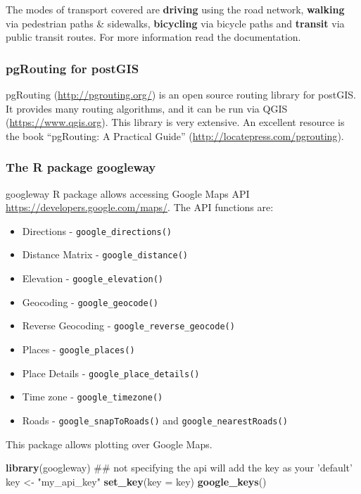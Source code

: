 \documentclass[12pt,graybox,envcountchap,sectrefs]{krantz}
\makeatletter
\newenvironment{Shaded}{\begin{snugshade}}{\end{snugshade}}
\newcommand{\KeywordTok}[1]{\textcolor[rgb]{0.13,0.29,0.53}{\textbf{#1}}}
\newcommand{\DataTypeTok}[1]{\textcolor[rgb]{0.13,0.29,0.53}{#1}}
\newcommand{\StringTok}[1]{\textcolor[rgb]{0.31,0.60,0.02}{#1}}
\newcommand{\NormalTok}[1]{#1}
\providecommand{\tightlist}{%
  \setlength{\itemsep}{0pt}\setlength{\parskip}{0pt}}
\newenvironment{kframe}{%
\medskip{}
\setlength{\fboxsep}{.8em}
 \def\at@end@of@kframe{}%
 \ifinner\ifhmode%
  \def\at@end@of@kframe{\end{minipage}}%
  \begin{minipage}{\columnwidth}%
 \fi\fi%
 \def\FrameCommand##1{\hskip\@totalleftmargin \hskip-\fboxsep
 \colorbox{shadecolor}{##1}\hskip-\fboxsep
     \hskip-\linewidth \hskip-\@totalleftmargin \hskip\columnwidth}%
 \MakeFramed {\advance\hsize-\width
   \@totalleftmargin\z@ \linewidth\hsize
   \@setminipage}}%
 {\par\unskip\endMakeFramed%
 \at@end@of@kframe}
\renewenvironment{Shaded}{\begin{kframe}}{\end{kframe}}
\theoremstyle{definition}
\theoremstyle{definition}
\theoremstyle{definition}
\theoremstyle{remark}
\makeatother
\begin{document}
The modes of transport covered are \textbf{driving} using the road
network, \textbf{walking} via pedestrian paths \& sidewalks,
\textbf{bicycling} via bicycle paths and \textbf{transit} via public
transit routes. For more information read the documentation.

\subsubsection{pgRouting for postGIS}\label{pgrouting-for-postgis}

pgRouting (\url{http://pgrouting.org/}) is an open source routing
library for postGIS. It provides many routing algorithms, and it can be
run via QGIS (\url{https://www.qgis.org}). This library is very
extensive. An excellent resource is the book ``pgRouting: A Practical
Guide'' (\url{http://locatepress.com/pgrouting}).

\subsubsection{The R package googleway}\label{the-r-package-googleway}

googleway \citep{googleway} R package allows accessing Google Maps API
\url{https://developers.google.com/maps/}. The API functions are:

\begin{itemize}
\tightlist
\item
  Directions - \texttt{google\_directions()}
\item
  Distance Matrix - \texttt{google\_distance()}
\item
  Elevation - \texttt{google\_elevation()}
\item
  Geocoding - \texttt{google\_geocode()}
\item
  Reverse Geocoding - \texttt{google\_reverse\_geocode()}
\item
  Places - \texttt{google\_places()}
\item
  Place Details - \texttt{google\_place\_details()}
\item
  Time zone - \texttt{google\_timezone()}
\item
  Roads - \texttt{google\_snapToRoads()} and
  \texttt{google\_nearestRoads()}
\end{itemize}

This package allows plotting over Google Maps.

\begin{Shaded}
\begin{Highlighting}[]
\KeywordTok{library}\NormalTok{(googleway)}
\NormalTok{## not specifying the api will add the key as your 'default'}
\NormalTok{key <-}\StringTok{ "my_api_key"}
\KeywordTok{set_key}\NormalTok{(}\DataTypeTok{key =}\NormalTok{ key)}
\KeywordTok{google_keys}\NormalTok{()}
\end{Highlighting}
\end{Shaded}
\end{document}
